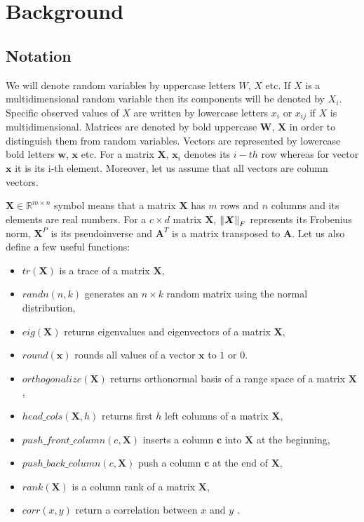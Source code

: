 
\chapter{Background}
\section{Notation}

We will denote random variables by uppercase letters $W$, $X$ etc. If $X$ is a multidimensional random variable then its components will be denoted by $X_i$. Specific observed values of $X$ are written by lowercase letters $x_i$ or $x_{ij}$ if $X$ is multidimensional. Matrices are denoted by bold uppercase $\boldsymbol{W}$, $\boldsymbol{X}$ in order to distinguish them from random variables. Vectors are represented by lowercase bold letters $\boldsymbol{w}$, $\boldsymbol{x}$ etc. For a matrix $\boldsymbol{X}$, $\boldsymbol{x}_{i}$ denotes its $i-th$ row whereas for vector $\boldsymbol{x}$ it is its i-th element. Moreover, let us assume that all vectors are column vectors. 

$\boldsymbol{X} \in \mathbb{R}^{m \times n}$ symbol means that a matrix $\boldsymbol{X}$ has $m$ rows and $n$ columns and its elements are real numbers. For a $c \times d$  matrix $\boldsymbol{X}$, $\left\lVert\boldsymbol{X}\right\rVert_{F}$ represents its Frobenius norm, $\boldsymbol{X}^P$ is its pseudoinverse and $\boldsymbol{A}^T$ is a matrix transposed to $\boldsymbol{A}$. 
Let us also define a few useful functions:
\begin{itemize}
\item $tr(\boldsymbol{X})$ is a trace of a matrix $\boldsymbol{X}$, 
\item $randn(n,k)$ generates an $n \times k$ random matrix using the normal distribution,
\item $eig(\boldsymbol{X})$ returns eigenvalues and eigenvectors of a matrix $\boldsymbol{X}$,
\item $round(\boldsymbol{x})$ rounds all values of a vector $\boldsymbol{x}$ to $1$ or $0$.
\item $orthogonalize(\boldsymbol{X})$ returns orthonormal basis of a range space of a matrix $\boldsymbol{X}$,
\item $head\_cols(\boldsymbol{X},h)$ returns first $h$ left columns of a matrix $\boldsymbol{X}$,
\item $push\_front\_column(c,\boldsymbol{X})$ inserts a column $\boldsymbol{c}$ into $\boldsymbol{X}$ at the beginning,
\item $push\_back\_column(c,\boldsymbol{X})$ push a column $\boldsymbol{c}$ at the end of $\boldsymbol{X}$,
\item $rank(\boldsymbol{X})$ is a column rank of a matrix $\boldsymbol{X}$,
\item $corr(x,y)$ return a correlation between $x$ and $y$ . 

\end{itemize}

